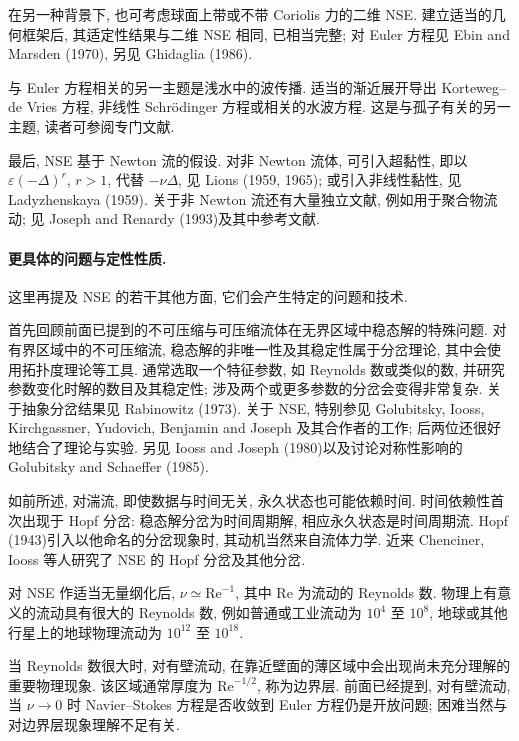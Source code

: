 \hypertarget{appendix-03-page-374}{}
在另一种背景下, 也可考虑球面上带或不带 Coriolis 力的二维 NSE. 建立适当的几何框架后, 其适定性结果与二维 NSE 相同, 已相当完整; 对 Euler 方程见 Ebin and Marsden (1970), 另见 Ghidaglia (1986).

与 Euler 方程相关的另一主题是浅水中的波传播. 适当的渐近展开导出 Korteweg--de Vries 方程, 非线性 Schr\"odinger 方程或相关的水波方程. 这是与孤子有关的另一主题, 读者可参阅专门文献.

最后, NSE 基于 Newton 流的假设. 对非 Newton 流体, 可引入超黏性, 即以 $\varepsilon(-\Delta)^r$, $r>1$, 代替 $-\nu\Delta$, 见 Lions (1959, 1965); 或引入非线性黏性, 见 Ladyzhenskaya (1959). 关于非 Newton 流还有大量独立文献, 例如用于聚合物流动; 见 Joseph and Renardy (1993)及其中参考文献.

\paragraph{更具体的问题与定性性质.}
这里再提及 NSE 的若干其他方面, 它们会产生特定的问题和技术.

首先回顾前面已提到的不可压缩与可压缩流体在无界区域中稳态解的特殊问题. 对有界区域中的不可压缩流, 稳态解的非唯一性及其稳定性属于分岔理论, 其中会使用拓扑度理论等工具. 通常选取一个特征参数, 如 Reynolds 数或类似的数, 并研究参数变化时解的数目及其稳定性; 涉及两个或更多参数的分岔会变得非常复杂. 关于抽象分岔结果见 Rabinowitz (1973). 关于 NSE, 特别参见 Golubitsky, Iooss, Kirchgassner, Yudovich, Benjamin and Joseph 及其合作者的工作; 后两位还很好地结合了理论与实验. 另见 Iooss and Joseph (1980)以及讨论对称性影响的 Golubitsky and Schaeffer (1985).

如前所述, 对湍流, 即使数据与时间无关, 永久状态也可能依赖时间. 时间依赖性首次出现于 Hopf 分岔: 稳态解分岔为时间周期解, 相应永久状态是时间周期流. Hopf (1943)引入以他命名的分岔现象时, 其动机当然来自流体力学. 近来 Chenciner, Iooss 等人研究了 NSE 的 Hopf 分岔及其他分岔.

对 NSE 作适当无量纲化后, $\nu\simeq\mathrm{Re}^{-1}$, 其中 $\mathrm{Re}$ 为流动的 Reynolds 数. 物理上有意义的流动具有很大的 Reynolds 数, 例如普通或工业流动为 $10^4$ 至 $10^8$, 地球或其他行星上的地球物理流动为 $10^{12}$ 至 $10^{18}$.

\hypertarget{appendix-03-page-375}{}
当 Reynolds 数很大时, 对有壁流动, 在靠近壁面的薄区域中会出现尚未充分理解的重要物理现象. 该区域通常厚度为 $\mathrm{Re}^{-1/2}$, 称为边界层. 前面已经提到, 对有壁流动, 当 $\nu\to0$ 时 Navier--Stokes 方程是否收敛到 Euler 方程仍是开放问题; 困难当然与对边界层现象理解不足有关.

